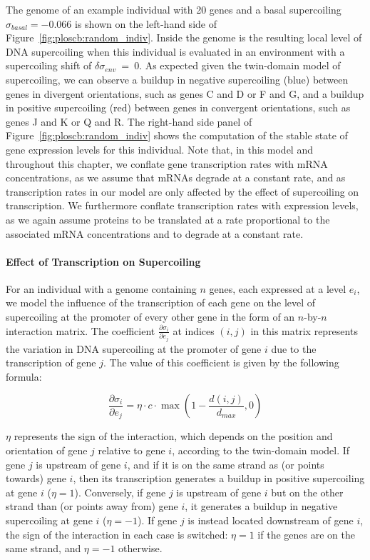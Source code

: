 The genome of an example individual with 20 genes and a basal supercoiling $\sigma_{basal} = -0.066$ is shown on the left-hand side of Figure~\ref{fig:ploscb:random_indiv}.
Inside the genome is the resulting local level of DNA supercoiling when this individual is evaluated in an environment with a supercoiling shift of $\delta\sigma_{env}~=~0$.
As expected given the twin-domain model of supercoiling, we can observe a buildup in negative supercoiling (blue) between genes in divergent orientations, such as genes C and D or F and G, and a buildup in positive supercoiling (red) between genes in convergent orientations, such as genes J and K or Q and R.
The right-hand side panel of Figure~\ref{fig:ploscb:random_indiv} shows the computation of the stable state of gene expression levels for this individual.
Note that, in this model and throughout this chapter, we conflate
gene transcription rates with mRNA concentrations, as we assume that mRNAs degrade at a constant rate, and as transcription rates in our model are only affected by the effect of supercoiling on transcription.
We furthermore conflate transcription rates with expression levels, as we again assume proteins to be translated at a rate proportional to the associated mRNA concentrations and to degrade at a constant rate.

\paragraph{Effect of Transcription on Supercoiling}
For an individual with a genome containing $n$ genes, each expressed at a level $e_i$, we model the influence of the transcription of each gene on the level of supercoiling at the promoter of every other gene in the form of an $n$-by-$n$ interaction matrix.
The coefficient $\frac{\partial\sigma_i}{\partial e_j}$ at indices $(i, j)$ in this matrix represents the variation in DNA supercoiling at the promoter of gene $i$ due to the transcription of gene $j$.
The value of this coefficient is given by the following formula:

\begin{equation}
\frac{\partial\sigma_{i}}{\partial e_j} = \eta \cdot c \cdot \max(1-\frac{d(i, j)}{d_{max}}, 0)
\label{eq:dsigmade}
\end{equation}

$\eta$ represents the sign of the interaction, which depends on the position and orientation of gene $j$ relative to gene $i$, according to the twin-domain model.
If gene $j$ is upstream of gene $i$, and if it is on the same strand as (or points towards) gene $i$, then its transcription generates a buildup in positive supercoiling at gene $i$ ($\eta = 1$).
Conversely, if gene $j$ is upstream of gene $i$ but on the other strand than (or points away from) gene $i$, it generates a buildup in negative supercoiling at gene $i$ ($\eta = -1$).
If gene $j$ is instead located downstream of gene $i$, the sign of the interaction in each case is switched: $\eta = 1$ if the genes are on the same strand, and $\eta = -1$ otherwise.

